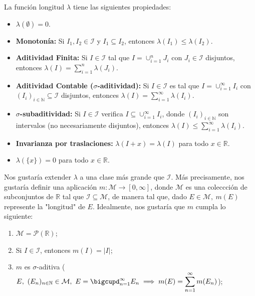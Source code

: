 \documentclass[11pt]{article}
\theoremstyle{definition} %
\newcommand{\R}{\mathbb{R}}
\newcommand{\N}{\mathbb{N}}
\begin{document}
\begin{property}
La función longitud $\lambda$ tiene las siguientes propiedades:
\begin{itemize}
    \item $\lambda(\emptyset) = 0$.
    \item \textbf{Monotonía:} Si $I_1, I_2 \in \mathcal{I}$ y $I_1 \subseteq I_2$, entonces $\lambda(I_1) \le \lambda(I_2)$.
    \item \textbf{Aditividad Finita:} Si $I \in \mathcal{I}$ tal que $I = \cup_{i=1}^{n} J_i$ con $J_i \in \mathcal{I}$ disjuntos, entonces $\lambda(I) = \sum_{i=1}^{n} \lambda(J_i)$.
    \item \textbf{Aditividad Contable ($\sigma$-aditividad):} Si $I \in \mathcal{I}$ es tal que $I = \cup_{i=1}^{\infty} I_i$ con $(I_i)_{i \in \mathbb{N}} \subseteq \mathcal{I}$ disjuntos, entonces $\lambda(I) = \sum_{i=1}^{\infty} \lambda(I_i)$.
    \item \textbf{$\sigma$-subaditividad:} Si $I \in \mathcal{I}$ verifica $I \subseteq \cup_{i=1}^{\infty} I_i$, donde $(I_i)_{i \in \mathbb{N}}$ son intervalos (no necesariamente disjuntos), entonces $\lambda(I) \le \sum_{i=1}^{\infty} \lambda(I_i)$.
    \item \textbf{Invarianza por traslaciones:} $\lambda(I+x) = \lambda(I)$ para todo $x \in \mathbb{R}$.
    \item $\lambda(\{x\}) = 0$ para todo $x \in \mathbb{R}$.
\end{itemize}

Nos gustaría extender $\lambda$ a una clase más grande que $\mathcal{I}$. Más precisamente, nos gustaría definir una aplicación $m : \mathcal{M} \to [0,\infty]$, donde $\mathcal{M}$ es una coleccción de subconjuntos de $\R$ tal que $\mathcal{I} \subseteq \mathcal{M}$, de manera tal que, dado $E \in \mathcal{M},\ m(E)$ represente la "longitud" de $E$. Idealmente, nos gustaría que $m$ cumpla lo siguiente:

	\begin{enumerate}
		\item $\mathcal{M} = \mathcal{P}(\R)$;

		\item Si $I \in \mathcal{I}$, entonces $m(I) = |I|$;

		\item $m$ es $\sigma$-aditiva ($E,\ (E_n)_{n\in\N}\in \mathcal{M},\ E = \displaystyle\bigcupd_{n=1}^{\infty} E_n \implies m(E) = \sum_{n=1}^{\infty} m(E_n)$);
	\end{enumerate}


\end{property}
\end{document}
